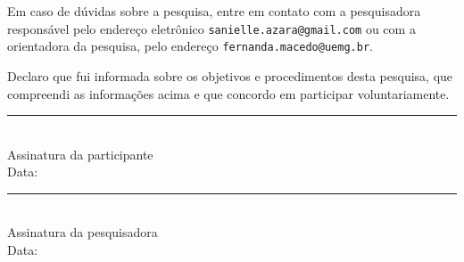 Em caso de dúvidas sobre a pesquisa, entre em contato com a pesquisadora responsável pelo endereço eletrônico \texttt{sanielle.azara@gmail.com} ou com a orientadora da pesquisa, pelo endereço  \texttt{fernanda.macedo@uemg.br}.

\bigskip

Declaro que fui informada sobre os objetivos e procedimentos desta pesquisa, que compreendi as informações acima e que concordo em participar voluntariamente.

\bigskip
\bigskip

\noindent
\begin{minipage}{0.45\textwidth}
    \centering
    \rule{6cm}{0.4pt}\\
    Assinatura da participante\\
    \bigskip
    Data: \underline{\hspace{3cm}}
\end{minipage}
\hfill
\begin{minipage}{0.45\textwidth}
    \centering
    \rule{6cm}{0.4pt}\\
    Assinatura da pesquisadora\\
    \bigskip
    Data: \underline{\hspace{3cm}}
\end{minipage}